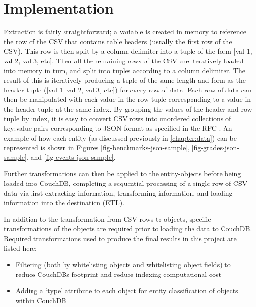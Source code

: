 \section{Implementation}
Extraction is fairly straightforward; a variable is created in memory to reference the row of the CSV that contains table headers (usually the first row of the CSV). This row is then split by a column delimiter into a tuple of the form [val 1, val 2, val 3, etc]. Then all the remaining rows of the CSV are iteratively loaded into memory in turn, and split into tuples according to a column delimiter. The result of this is iteratively producing a tuple of the same length and form as the header tuple ([val 1, val 2, val 3, etc]) for every row of data. Each row of data can then be manipulated with each value in the row tuple corresponding to a value in the header tuple at the same index. By grouping the values of the header and row tuple by index, it is easy to convert CSV rows into unordered collections of key:value pairs corresponding to JSON format as specified in the RFC \cite{rfc7159}. An example of how each entity (as discussed previously in \autoref{chapter:data}) can be represented is shown in Figures \ref{fig-benchmarks-json-sample}, \ref{fig-grades-json-sample}, and \ref{fig-events-json-sample}.





Further transformations can then be applied to the entity-objects before being loaded into CouchDB, completing a sequential processing of a single row of CSV data via first extracting information, transforming information, and loading information into the destination (ETL).

In addition to the transformation from CSV rows to objects, specific transformations of the objects are required prior to loading the data to CouchDB. Required transformations used to produce the final results in this project are listed here:

\begin{itemize}
  \item Filtering (both by whitelisting objects and whitelisting object fields) to reduce CouchDBs footprint and reduce indexing computational cost
  \item Adding a `type' attribute to each object for entity classification of objects within CouchDB
\end{itemize}

